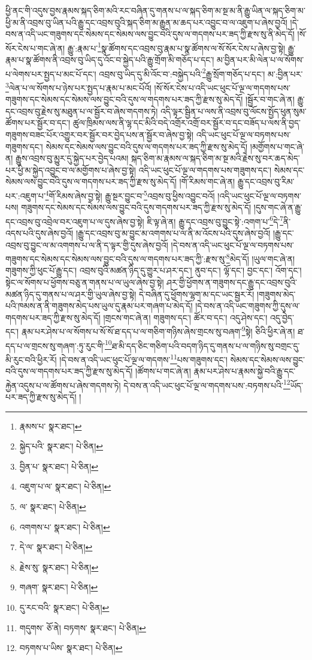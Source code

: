 ཕྱི་ནང་གི་འདུས་བྱས་རྣམས་སྐད་ཅིག་མའི་རང་བཞིན་དུ་གནས་པ་ལ་སྐད་ཅིག་མ་སྔ་མ་ནི་རྒྱུ་ཡིན་ལ་སྐད་ཅིག་མ་ཕྱི་མ་ནི་འབྲས་བུ་ཡིན་པའི་རྒྱུ་དང་འབྲས་བུའི་སྐད་ཅིག་མ་རྒྱུན་མ་ཆད་པར་འབྱུང་བ་ལ་འཇུག་པ་ཞེས་བྱའོ། །དེ་བས་ན་འདི་ཡང་གཟུགས་དང་སེམས་དང་སེམས་ལས་བྱུང་བའི་དུས་ལ་གདགས་པར་ཟད་ཀྱི་རྫས་སུ་ནི་མེད་དོ། །སོ་སོར་ངེས་པ་གང་ཞེ་ན། རྒྱུ་:རྣམ་པ་\footnote{རྣམས་པ་  སྣར་ཐང་། }སྣ་ཚོགས་དང་འབྲས་བུ་རྣམ་པ་སྣ་ཚོགས་ལ་སོ་སོར་ངེས་པ་ཞེས་བྱ་སྟེ། རྒྱུ་རྣམ་པ་སྣ་ཚོགས་ནི་འབྲས་བུ་ཡིད་དུ་འོང་བ་སྐྱེད་པའི་རྒྱུ་གྲོག་མི་གཅོད་པ་དང་། མ་བྱིན་པར་མི་ལེན་པ་ལ་སོགས་པ་ལེགས་པར་སྤྱད་པ་མང་པོ་དང་། འབྲས་བུ་ཡིད་དུ་མི་འོང་བ་:བསྐྱེད་པའི་\footnote{སྐྱེད་པའི་  སྣར་ཐང་།  པེ་ཅིན། }རྒྱུ་སྲོག་གཅོད་པ་དང་། མ་:བྱིན་པར་\footnote{བྱིན་པ་  སྣར་ཐང་།  པེ་ཅིན། }ལེན་པ་ལ་སོགས་པ་ཉེས་པར་སྤྱད་པ་རྣམ་པ་མང་པོའོ། །སོ་སོར་ངེས་པ་འདི་ཡང་ཕུང་པོ་ལྔ་ལ་གདགས་པས་གཟུགས་དང་སེམས་དང་སེམས་ལས་བྱུང་བའི་དུས་ལ་གདགས་པར་ཟད་ཀྱི་རྫས་སུ་མེད་དོ། །སྦྱོར་བ་གང་ཞེ་ན། རྒྱུ་དང་འབྲས་བུ་རྗེས་སུ་མཐུན་པ་ལ་སྦྱོར་བ་ཞེས་གདགས་ཏེ། འདི་ལྟར་སྦྱིན་པ་ལས་ནི་འབྲས་བུ་ལོངས་སྤྱོད་ཕུན་སུམ་ཚོགས་པར་སྦྱོར་བ་དང་། ཚུལ་ཁྲིམས་ལས་ནི་ལྷ་དང་མིའི་བདེ་འགྲོར་འགྲོ་བར་སྦྱོར་བ་དང་བཟོད་པ་ལས་ནི་བྱད་གཟུགས་བཟང་པོར་འགྱུར་བར་སྦྱོར་བར་བྱེད་པས་ན་སྦྱོར་བ་ཞེས་བྱ་སྟེ། འདི་ཡང་ཕུང་པོ་ལྔ་ལ་བཏགས་པས་གཟུགས་དང་། སེམས་དང་སེམས་ལས་བྱུང་བའི་དུས་ལ་གདགས་པར་ཟད་ཀྱི་རྫས་སུ་མེད་དོ། །མགྱོགས་པ་གང་ཞེ་ན། རྒྱུས་འབྲས་བུ་མྱུར་དུ་སྐྱེད་པར་བྱེད་པའམ། སྐད་ཅིག་མ་རྣམས་ལ་སྐད་ཅིག་མ་སྔ་མའི་རྗེས་སུ་བར་ཆད་མེད་པར་ཕྱི་མ་སྐྱེད་འབྱུང་བ་ལ་མགྱོགས་པ་ཞེས་བྱ་སྟེ། འདི་ཡང་ཕུང་པོ་ལྔ་ལ་གདགས་པས་གཟུགས་དང་། སེམས་དང་སེམས་ལས་བྱུང་བའི་དུས་ལ་གདགས་པར་ཟད་ཀྱི་རྫས་སུ་མེད་དོ། །གོ་རིམས་གང་ཞེ་ན། རྒྱུ་དང་འབྲས་བུ་རིམ་པར་:འཇུག་པ་\footnote{འཇུག་པ་ལ་  སྣར་ཐང་།  པེ་ཅིན། }གོ་རིམས་ཞེས་བྱ་སྟེ། རྒྱུ་སྔར་བྱུང་བ་\footnote{ལ་  སྣར་ཐང་།  པེ་ཅིན། }འབྲས་བུ་ཕྱིས་འབྱུང་བའོ། །འདི་ཡང་ཕུང་པོ་ལྔ་ལ་བཏགས་པས། གཟུགས་དང་སེམས་དང་སེམས་ལས་བྱུང་བའི་དུས་གདགས་པར་ཟད་ཀྱི་རྫས་སུ་མེད་དོ། །དུས་གང་ཞེ་ན་རྒྱུ་དང་འབྲས་བུ་འབྲེལ་བར་འཇུག་པ་ལ་དུས་ཞེས་བྱ་སྟེ། ཇི་ལྟ་ཞེ་ན། རྒྱུ་དང་འབྲས་བུ་བྱུང་སྟེ་:འགག་པ་\footnote{འགགས་པ་  སྣར་ཐང་།  པེ་ཅིན། }དེ་\footnote{དེ་ལ་  སྣར་ཐང་།  པེ་ཅིན། }ནི་འདས་པའི་དུས་ཞེས་བྱའོ། །རྒྱུ་དང་འབྲས་བུ་མ་བྱུང་མ་འགགས་པ་ལ་ནི་མ་འོངས་པའི་དུས་ཞེས་བྱའོ། །རྒྱུ་དང་འབྲས་བུ་བྱུང་ལ་མ་འགགས་པ་ལ་ནི་ད་ལྟར་གྱི་དུས་ཞེས་བྱའོ། །དེ་བས་ན་འདི་ཡང་ཕུང་པོ་ལྔ་ལ་བཏགས་པས་གཟུགས་དང་སེམས་དང་སེམས་ལས་བྱུང་བའི་དུས་ལ་གདགས་པར་ཟད་ཀྱི་:རྫས་སུ་\footnote{རྗེས་སུ་  སྣར་ཐང་།  པེ་ཅིན། }མེད་དོ། །ཡུལ་གང་ཞེ་ན། གཟུགས་ཀྱི་ཕུང་པོ་རྒྱུ་དང་། འབྲས་བུའི་མཚན་ཉིད་དུ་གྱུར་པ་ཤར་དང་། ནུབ་དང་། ལྷོ་དང་། བྱང་དང་། འོག་དང་། སྟེང་ལ་སོགས་པ་ཕྱོགས་བཅུ་ན་གནས་པ་ལ་ཡུལ་ཞེས་བྱ་སྟེ། ཤར་གྱི་ཕྱོགས་ན་གཟུགས་དང་རྒྱུ་དང་འབྲས་བུའི་མཚན་ཉིད་དུ་གནས་པ་ལ་ཤར་གྱི་ཡུལ་ཞེས་བྱ་སྟེ། དེ་བཞིན་དུ་ཕྱོགས་ལྷག་མ་དང་ཡང་སྦྱར་རོ། །གཟུགས་མེད་པའི་ཁམས་ན་ནི་གཟུགས་མེད་པས་ཡུལ་དུ་རྣམ་པར་གཞག་པ་མེད་དོ། །དེ་བས་ན་འདི་ཡང་གཟུགས་ཀྱི་དུས་ལ་གདགས་པར་ཟད་ཀྱི་རྫས་སུ་མེད་དོ། །གྲངས་གང་ཞེ་ན། གཟུགས་དང་། ཚོར་བ་དང་། འདུ་ཤེས་དང་། འདུ་བྱེད་དང་། རྣམ་པར་ཤེས་པ་ལ་སོགས་པ་སོ་སོ་ཐ་དད་པ་ལ་གཅིག་གཉིས་ཞེས་གྲངས་སུ་བཞག་\footnote{གཞག་  སྣར་ཐང་།  པེ་ཅིན། }སྟེ། ཅིའི་ཕྱིར་ཞེ་ན། ཐ་དད་པ་ལ་གྲངས་སུ་གཞག་:ཏུ་རུང་གི་\footnote{དུ་རང་བའི་  སྣར་ཐང་།  པེ་ཅིན། }ཐ་མི་དད་ཅིང་གཅིག་པའི་བདག་ཉིད་དུ་གནས་པ་ལ་གཉིས་སུ་བགྲང་དུ་མི་རུང་བའི་ཕྱིར་རོ། །དེ་བས་ན་འདི་ཡང་ཕུང་པོ་ལྔ་ལ་གདགས་\footnote{གདུགས་  ཅོ་ནེ། བཏགས་  སྣར་ཐང་།  པེ་ཅིན། }པས་གཟུགས་དང་། སེམས་དང་སེམས་ལས་བྱུང་བའི་དུས་ལ་གདགས་པར་ཟད་ཀྱི་རྫས་སུ་མེད་དོ། །ཚོགས་པ་གང་ཞེ་ན། རྣམ་པར་ཤེས་པ་རྣམས་སྐྱེ་བའི་རྒྱུ་དང་རྐྱེན་འདུས་པ་ལ་ཚོགས་པ་ཞེས་གདགས་ཏེ། དེ་བས་ན་འདི་ཡང་ཕུང་པོ་ལྔ་ལ་གདགས་པས་:བཏགས་པའི་\footnote{བཏགས་པ་ཡིས་  སྣར་ཐང་།  པེ་ཅིན། }ཡོད་པར་ཟད་ཀྱི་རྫས་སུ་མེད་དོ། །
